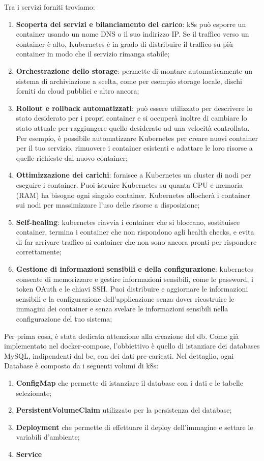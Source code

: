 \documentclass{article}
\begin{document}
Tra i servizi forniti troviamo:

\begin{enumerate} 
    \item \textbf{Scoperta dei servizi e bilanciamento del carico}: k8s può esporre un container usando un nome DNS o il suo indirizzo IP. Se il traffico verso un container è alto, Kubernetes è in grado di distribuire il traffico su più container in modo che il servizio rimanga stabile;
    \item \textbf{Orchestrazione dello storage}: permette di montare automaticamente un sistema di archiviazione a scelta, come per esempio storage locale, dischi forniti da cloud pubblici e altro ancora;
    \item \textbf{Rollout e rollback automatizzati}: può essere utilizzato per descrivere lo stato desiderato per i propri container e si occuperà inoltre di cambiare lo stato attuale per raggiungere quello desiderato ad una velocità controllata. Per esempio, è possibile automatizzare Kubernetes per creare nuovi container per il tuo servizio, rimuovere i container esistenti e adattare le loro risorse a quelle richieste dal nuovo container;
    \item \textbf{Ottimizzazione dei carichi}: fornisce a Kubernetes un cluster di nodi per eseguire i container. Puoi istruire Kubernetes su quanta CPU e memoria (RAM) ha bisogno ogni singolo container. Kubernetes allocherà i container sui nodi per massimizzare l'uso delle risorse a disposizione;
    \item \textbf{Self-healing}: kubernetes riavvia i container che si bloccano, sostituisce container, termina i container che non rispondono agli health checks, e evita di far arrivare traffico ai container che non sono ancora pronti per rispondere correttamente;
    \item \textbf{Gestione di informazioni sensibili e della configurazione}: kubernetes consente di memorizzare e gestire informazioni sensibili, come le password, i token OAuth e le chiavi SSH. Puoi distribuire e aggiornare le informazioni sensibili e la configurazione dell'applicazione senza dover ricostruire le immagini dei container e senza svelare le informazioni sensibili nella configurazione del tuo sistema;
\end{enumerate}

Per prima cosa, è stata dedicata attenzione alla creazione del db. Come già implementato nel docker-compose,
l’obbiettivo è quello di istanziare dei databases MySQL, indipendenti dal be, con dei dati pre-caricati.
Nel dettaglio, ogni Database è composto da i seguenti volumi di k8s:
\begin{enumerate}
    \item \textbf{ConfigMap} che permette di istanziare il database con i dati e le tabelle selezionate;
    \item \textbf{PersistentVolumeClaim} utilizzato per la persistenza del database;
    \item \textbf{Deployment} che permette di effettuare il deploy dell'immagine e settare le variabili d'ambiente;
    \item \textbf{Service} 
\end{enumerate}
\end{document}
